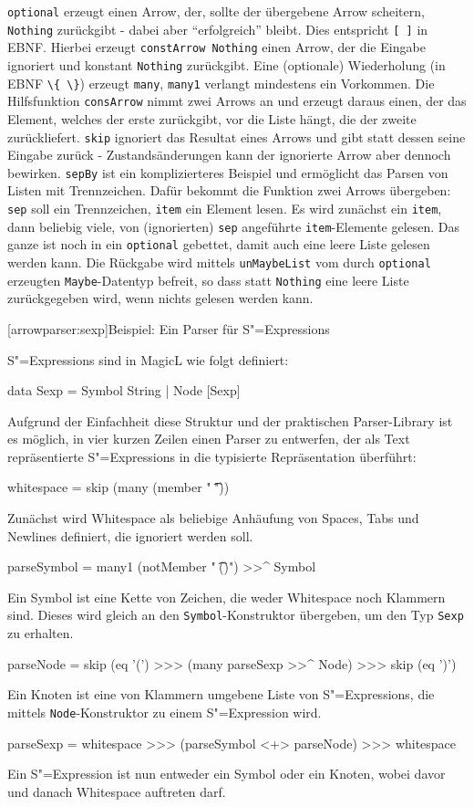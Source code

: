 \documentclass[11pt, a4paper, bibgerm]{scrbook}
\newcommand\icode[1]{\lstinline?#1?}
\newcommand\lsection{}
\newcommand{\sexp}{S"=Expression}
\newcommand{\sexps}{S"=Expressions}
\begin{document}
\icode{optional} erzeugt einen Arrow, der, sollte der übergebene Arrow
scheitern, \icode{Nothing} zurückgibt - dabei aber "`erfolgreich"'
bleibt. Dies entspricht \icode{[ ]} in EBNF. Hierbei erzeugt
\icode{constArrow Nothing} einen Arrow, der die Eingabe ignoriert und
konstant \icode{Nothing} zurückgibt. Eine (optionale) Wiederholung (in EBNF
\icode{\{ \}}) erzeugt \icode{many}, \icode{many1} verlangt mindestens
ein Vorkommen. Die Hilfsfunktion \icode{consArrow} nimmt zwei
Arrows an und erzeugt daraus einen, der das Element, welches der erste
zurückgibt, vor die Liste hängt, die der zweite zurückliefert.
\icode{skip} ignoriert das Resultat eines Arrows und gibt
statt dessen seine Eingabe zurück - Zustandsänderungen kann der
ignorierte Arrow aber dennoch bewirken. \icode{sepBy} ist ein
komplizierteres Beispiel und ermöglicht das Parsen von Listen mit
Trennzeichen. Dafür bekommt die Funktion zwei Arrows übergeben:
\icode{sep} soll ein Trennzeichen, \icode{item} ein Element lesen. Es
wird zunächst ein \icode{item}, dann beliebig viele, von (ignorierten)
\icode{sep} angeführte \icode{item}-Elemente gelesen. Das ganze ist noch
in ein \icode{optional} gebettet, damit auch eine leere Liste gelesen
werden kann. Die Rückgabe wird mittels \icode{unMaybeList} vom durch
\icode{optional} erzeugten \icode{Maybe}-Datentyp befreit, so dass statt
\icode{Nothing} eine leere Liste zurückgegeben wird, wenn nichts gelesen
werden kann.

\lsection[arrowparser:sexp]{Beispiel: Ein Parser für \sexps{}}

\sexps{} sind in MagicL wie folgt definiert:
\begin{code}
data Sexp = Symbol String
          | Node [Sexp]
\end{code}

Aufgrund der Einfachheit diese Struktur und der praktischen
Parser-Library ist es möglich, in vier kurzen Zeilen einen Parser zu
entwerfen, der als Text repräsentierte \sexps{} in die typisierte
Repräsentation überführt:

\begin{code}
whitespace = skip (many (member " \t\n"))
\end{code}
Zunächst wird Whitespace als beliebige Anhäufung von Spaces, Tabs und
Newlines definiert, die ignoriert werden soll.
\begin{code}
parseSymbol = many1 (notMember " \t\n()") >>^ Symbol
\end{code} %
Ein Symbol ist eine Kette von Zeichen, die weder Whitespace noch
Klammern sind. Dieses wird gleich an den \icode{Symbol}-Konstruktor
übergeben, um den Typ \icode{Sexp} zu erhalten.
\begin{code}
parseNode = skip (eq '(') >>> (many parseSexp >>^ Node) >>> skip (eq ')')
\end{code} %
Ein Knoten ist eine von Klammern umgebene Liste von \sexps{}, die
mittels \icode{Node}-Konstruktor zu einem \sexp{} wird.
\begin{code}
parseSexp = whitespace >>> (parseSymbol <+> parseNode) >>> whitespace
\end{code} %
Ein \sexp{} ist nun entweder ein Symbol oder ein Knoten, wobei davor und
danach Whitespace auftreten darf.
\end{document}
